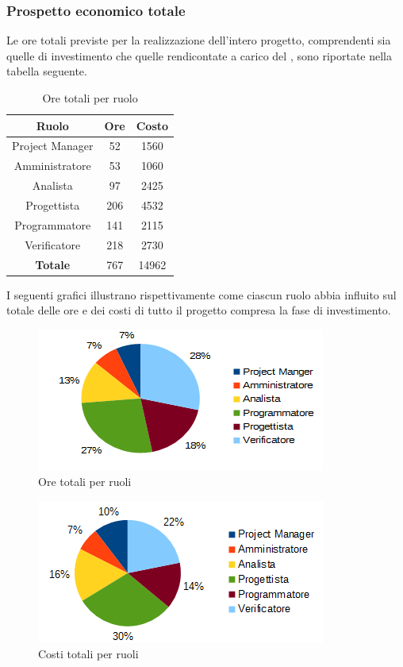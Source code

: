 		\subsubsection{Prospetto economico totale}
		Le ore totali previste per la realizzazione dell'intero progetto, comprendenti sia quelle di investimento che quelle rendicontate a carico del , sono riportate nella tabella seguente. \\
		\begin{table}[H]
		\centering
		\begin{tabular}{|c|c|c|}
			\hline
			\textbf{Ruolo}		& \textbf{Ore}	& \textbf{Costo} \\
			\hline
			Project Manager		& 52			& 1560	\\
			Amministratore		& 53			& 1060	\\
			Analista			& 97			& 2425	\\
			Progettista			& 206			& 4532	\\
			Programmatore		& 141			& 2115	\\
			Verificatore		& 218			& 2730	\\
			\hline
			\textbf{Totale}		& 767			& 14962	\\
			\hline
		\end{tabular}
		\caption{Ore totali per ruolo}
		\end{table}
		I seguenti grafici illustrano rispettivamente come ciascun ruolo abbia influito sul totale delle ore e dei costi di tutto il progetto compresa la fase di investimento. \\
		\begin{figure}[H]
		\centering
			\includegraphics[scale=1]{immagini/grafici/riepilogo_conclusivo-torta.png}
			\caption{Ore totali per ruoli}
		\end{figure}
		\begin{figure}[H]
			\centering
			\includegraphics[scale=1]{immagini/grafici/riepilogo_conclusivo-torta-costo.png}
			\caption{Costi totali per ruoli}
		\end{figure}
